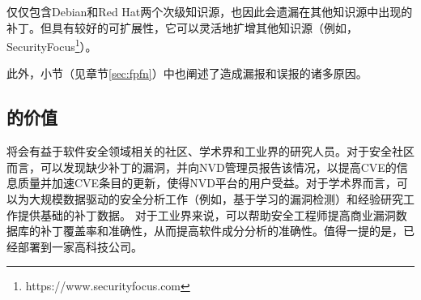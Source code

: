 \tool 仅仅包含Debian和Red Hat两个次级知识源，也因此会遗漏在其他知识源中出现的补丁。但\tool 具有较好的可扩展性，它可以灵活地扩增其他知识源（例如，SecurityFocus\footnote{https://www.securityfocus.com}）。

此外，小节（见章节\ref{sec:fpfn}）中也阐述了造成\tool 漏报和误报的诸多原因。

\subsection{\tool 的价值}
\tool 将会有益于软件安全领域相关的社区、学术界和工业界的研究人员。对于安全社区而言，\tool 可以发现缺少补丁的漏洞，并向NVD管理员报告该情况，以提高CVE的信息质量并加速CVE条目的更新，使得NVD平台的用户受益。对于学术界而言，\tool 可以为大规模数据驱动的安全分析工作（例如，基于学习的漏洞检测\cite{li2018vuldeepecker,zhou2019devign}）和经验研究工作提供基础的补丁数据。%
对于工业界来说，\tool 可以帮助安全工程师提高商业漏洞数据库的补丁覆盖率和准确性，从而提高软件成分分析的准确性。值得一提的是，\tool 已经部署到一家高科技公司。%